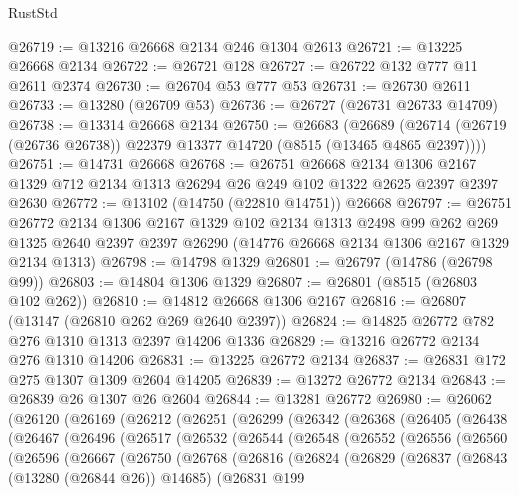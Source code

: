 \begin{lexlean}{RustStd}
\begin{coremodule}
@26719 := @13216 @26668 @2134 @246 @1304 @2613
@26721 := @13225 @26668 @2134
@26722 := @26721 @128
@26727 := @26722 @132 @777 @11 @2611 @2374
@26730 := @26704 @53 @777 @53
@26731 := @26730 @2611
@26733 := @13280 (@26709 @53)
@26736 := @26727 (@26731 @26733 @14709)
@26738 := @13314 @26668 @2134
@26750 := @26683
    (@26689 (@26714 (@26719 (@26736 @26738)) @22379 @13377 @14720 (@8515 (@13465 @4865 @2397))))
@26751 := @14731 @26668
@26768 := @26751
    @26668
    @2134
    @1306
    @2167
    @1329
    @712
    @2134
    @1313
    @26294
    @26
    @249
    @102
    @1322
    @2625
    @2397
    @2397
    @2630
@26772 := @13102 (@14750 (@22810 @14751)) @26668
@26797 := @26751
    @26772
    @2134
    @1306
    @2167
    @1329
    @102
    @2134
    @1313
    @2498
    @99
    @262
    @269
    @1325
    @2640
    @2397
    @2397
    @26290
    (@14776 @26668 @2134 @1306 @2167 @1329 @2134 @1313)
@26798 := @14798 @1329
@26801 := @26797 (@14786 (@26798 @99))
@26803 := @14804 @1306 @1329
@26807 := @26801 (@8515 (@26803 @102 @262))
@26810 := @14812 @26668 @1306 @2167
@26816 := @26807 (@13147 (@26810 @262 @269 @2640 @2397))
@26824 := @14825 @26772 @782 @276 @1310 @1313 @2397 @14206 @1336
@26829 := @13216 @26772 @2134 @276 @1310 @14206
@26831 := @13225 @26772 @2134
@26837 := @26831 @172 @275 @1307 @1309 @2604 @14205
@26839 := @13272 @26772 @2134
@26843 := @26839 @26 @1307 @26 @2604
@26844 := @13281 @26772
@26980 := @26062
    (@26120
      (@26169
        (@26212
          (@26251
            (@26299
              (@26342
                (@26368
                  (@26405
                    (@26438
                      (@26467
                        (@26496
                          (@26517
                            (@26532
                              (@26544
                                (@26548
                                  (@26552
                                    (@26556
                                      (@26560
                                        (@26596
                                          (@26667
                                            (@26750
                                              (@26768
                                                (@26816
                                                  (@26824
                                                    (@26829
                                                      (@26837
                                                        (@26843 (@13280 (@26844 @26)) @14685)
                                                        (@26831
                                                          @199

\end{coremodule}
\end{lexlean}
